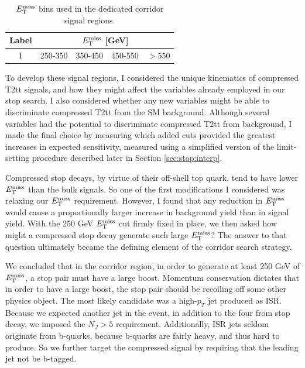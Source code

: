 \begin{table}[h]
\centering
\caption{$E_\text{T}^\text{miss}$ bins used in the dedicated corridor signal regions.}
\label{tab:stop:corridorsrs}
\begin{tabular}{|c|cccc|}
\hline
Label & \multicolumn{4}{c|}{$E_\text{T}^\text{miss}$ [GeV]} \\
\hline
I & 250-350 & 350-450 & 450-550 & $>550$ \\
\hline
\end{tabular}
\end{table}

To develop these signal regions, I considered the unique kinematics of
compressed T2tt signals, and how they might affect the variables
already employed in our stop search. I also considered whether any new
variables might be able to discriminate compressed T2tt from the SM
background. Although several variables had the potential to
discriminate compressed T2tt from background, I made the final choice
by measuring which added cuts provided the greatest increases in
expected sensitivity, measured using a simplified version of the
limit-setting procedure described later in Section
\ref{sec:stop:interp}.

Compressed stop decays, by virtue of their off-shell top quark, tend
to have lower $E_\text{T}^\text{miss}$ than the bulk signals. So one of the first
modifications I considered was relaxing our $E_\text{T}^\text{miss}$
requirement. However, I found that any reduction in $E_\text{T}^\text{miss}$ would cause a
proportionally larger increase in background yield than in signal
yield. With the 250 GeV $E_\text{T}^\text{miss}$ cut firmly fixed in place, we then
asked how might a compressed stop decay generate such large $E_\text{T}^\text{miss}$?
The answer to that question ultimately became the defining element of
the corridor search strategy.

We concluded that in the corridor region, in order to generate at least
250 GeV of $E_\text{T}^\text{miss}$, a stop pair must have a large boost. Momentum conservation
dictates that in order to have a large boost, the stop pair should be
recoiling off some other physics object. The most likely candidate was
a high-$p_T$ jet produced as ISR. Because we expected another jet in
the event, in addition to the four from stop decay, we imposed the
$N_J > 5$ requirement. Additionally, ISR jets seldom originate from
b-quarks, because b-quarks are fairly heavy, and thus hard to
produce. So we further target the compressed signal by requiring
that the leading jet not be b-tagged.

